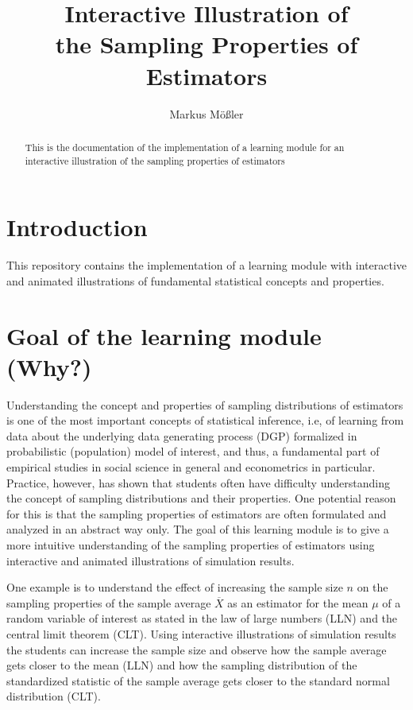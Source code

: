 \documentclass[12pt]{article}
\title{Interactive Illustration of \\ the Sampling Properties of \\ Estimators}
\author{Markus M\"o\ss ler}
\begin{document}
	
\maketitle
	
\begin{abstract}
This is the documentation of the implementation of a learning module for an interactive illustration of the sampling properties of estimators
\end{abstract}

\doublespacing

\section{Introduction}\label{SecInt}

This repository contains the implementation of a learning module with interactive and animated illustrations of fundamental statistical concepts and properties.

\section{Goal of the learning module (Why?)}\label{SecWhy}

Understanding the concept and properties of sampling distributions of estimators is one of the most important concepts of statistical inference, i.e, of learning from data about the underlying data generating process (DGP) formalized in probabilistic (population) model of interest, and thus, a fundamental part of empirical studies in social science in general and econometrics in particular. 
%
Practice, however, has shown that students often have difficulty understanding the concept of sampling distributions and their properties. 
%
One potential reason for this is that the sampling properties of estimators are often formulated and analyzed in an abstract way only. 
%
The goal of this learning module is to give a more intuitive understanding of the sampling properties of estimators using interactive and animated illustrations of simulation results. 

One example is to understand the effect of increasing the sample size $n$ on the sampling properties of the sample average $\overline{X}$ as an estimator for the mean $\mu$ of a random variable of interest as stated in the law of large numbers (LLN) and the central limit theorem (CLT). 
%
Using interactive illustrations of simulation results the students can increase the sample size and observe how the sample average gets closer to the mean (LLN) and how the sampling distribution of the standardized statistic of the sample average gets closer to the standard normal distribution (CLT). 
\end{document}
